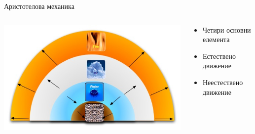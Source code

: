 \documentclass[10pt,a4paper]{beamer}
\begin{document}
        \begin{frame}{ Аристотелова механика }
			\begin{columns}
				\begin{column}{0.6\textwidth}
					\includegraphics[width=\textwidth]{images/aristotle_four_elements_motion.jpg}
				\end{column}
				\begin{column}{0.4\textwidth}
					\begin{itemize}
						\item Четири основни елемента
                        \item Естествено движение 
                        \item Неестествено движение
					\end{itemize}
				\end{column}
			\end{columns}
        \end{frame}
		
\end{document}

